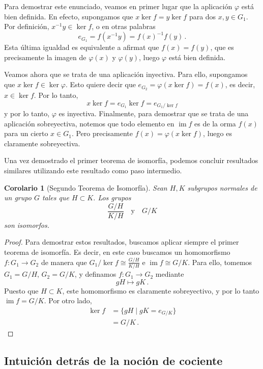 \documentclass[a4paper,11pt]{amsart}
\DeclareMathOperator{\im}{im}
\theoremstyle{plain}
\newtheorem{cor}[thm]{Corolario}
\theoremstyle{definition}
\theoremstyle{remark}
\begin{document}
Para demostrar este enunciado, veamos en primer lugar que la aplicación $\varphi$ está bien definida. En efecto, supongamos que $x \ker f = y \ker f$ para dos $x, y \in G_1$. Por definición, $x^{-1} y \in \ker f$, o en otras palabras 
\[ e_{G_1} = f(x^{-1} y) = f(x)^{-1} f(y) \, .\]
Esta última igualdad es equivalente a afirmat que $f(x) = f(y)$, que es precisamente la imagen de $\varphi(x)$ y $\varphi(y)$, luego $\varphi$ está bien definida. 


Veamos ahora que se trata de una aplicación inyectiva. Para ello, supongamos que $x \ker f \in \ker \varphi$. Esto quiere decir que $e_{G_2} = \varphi(x \ker f) = f(x)$, es decir, $x \in \ker f$. Por lo tanto, 
\[ x \ker f = e_{G_1} \ker f = e_{G_1/\ker f} \]
y por lo tanto, $\varphi$ es inyectiva. Finalmente, para demostrar que se trata de una aplicación sobreyectiva, notemos que todo elemento en $\im f$ es de la orma $f(x)$ para un cierto $x \in G_1$. Pero precisamente $f(x) = \varphi(x \ker f)$, luego es claramente sobreyectiva.

Una vez demostrado el primer teorema de isomorfía, podemos concluir resultados similares utilizando este resultado como paso intermedio. 

\begin{cor}[Segundo Teorema de Isomorfía]
Sean $H, K$ subgrupos normales de un grupo $G$ tales que $H \subset K$. Los grupos 
\[ \frac{G/H}{K/H}\quad \text{y} \quad G/K\] 
son isomorfos. 
\end{cor}
\begin{proof}
Para demostrar estos resultados, buscamos aplicar siempre el primer teorema de isomorfía. Es decir, en este caso buscamos un homomorfismo $f \colon G_1 \to G_2$ de manera que $G_1/\ker f \cong \frac{G/H}{K/H}$ e $\im f \cong G/K$. Para ello, tomemos $G_1 = G/H$, $G_2 = G/K$, y definamos $f \colon G_1 \to G_2$ mediante 
\[ gH \mapsto g K \, .\]
Puesto que $H \subset K$, este homomorfismo es claramente sobreyectivo, y por lo tanto $\im f = G/K$. Por otro lado, 
\begin{align*}
    \ker f & = \{ gH \mid gK = e_{G/K}\} \\
           & = G/K \, .
\end{align*}
\end{proof}


\subsection{Intuición detrás de la noción de cociente}
\end{document}
